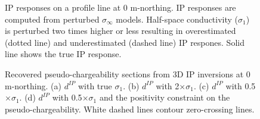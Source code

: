 \documentclass[extra,mreferee]{gji}
\newcommand{\siginf}{\sigma_\infty}
\newcommand{\dip}{d^{IP}}
\begin{document}
\begin{figure}
  \caption{IP responses on a profile line at 0 m-northing.  IP responses are computed from perturbed $\siginf$ models. Half-space conductivity ($\sigma_1$) is perturbed two times higher or less resulting in overestimated (dotted line) and underestimated (dashed line) IP respones. Solid line shows the true IP response. }
  \label{F:Reg_IPresp}
\end{figure}

\begin{figure}
  \caption{Recovered pseudo-chargeability sections from 3D IP inversions at 0 m-northing. (a) $\dip$ with true $\sigma_1$. (b) $\dip$ with 2$\times \sigma_1$. (c) $\dip$ with 0.5$\times \sigma_1$. (d) $\dip$ with 0.5$\times \sigma_1$ and the positivity constraint on the pseudo-chargeability. White dashed lines contour zero-crossing lines.}
  \label{F:Regional_IPInv}
\end{figure}
\end{document}
